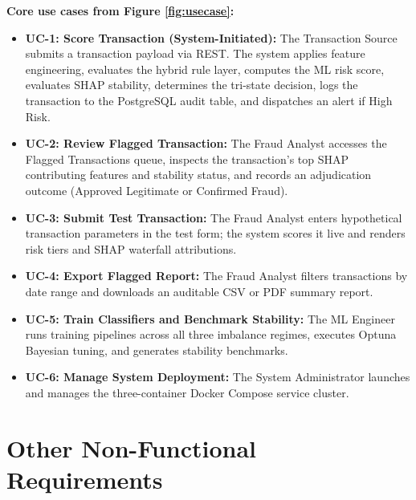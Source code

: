\documentclass[12pt, a4paper]{report}
\begin{document}
\noindent\textbf{Core use cases from Figure \ref{fig:usecase}:}
\begin{itemize}
    \item \textbf{UC-1: Score Transaction (System-Initiated):} The Transaction Source submits a transaction payload via REST. The system applies feature engineering, evaluates the hybrid rule layer, computes the ML risk score, evaluates SHAP stability, determines the tri-state decision, logs the transaction to the PostgreSQL audit table, and dispatches an alert if High Risk.
    \item \textbf{UC-2: Review Flagged Transaction:} The Fraud Analyst accesses the Flagged Transactions queue, inspects the transaction's top SHAP contributing features and stability status, and records an adjudication outcome (Approved Legitimate or Confirmed Fraud).
    \item \textbf{UC-3: Submit Test Transaction:} The Fraud Analyst enters hypothetical transaction parameters in the test form; the system scores it live and renders risk tiers and SHAP waterfall attributions.
    \item \textbf{UC-4: Export Flagged Report:} The Fraud Analyst filters transactions by date range and downloads an auditable CSV or PDF summary report.
    \item \textbf{UC-5: Train Classifiers and Benchmark Stability:} The ML Engineer runs training pipelines across all three imbalance regimes, executes Optuna Bayesian tuning, and generates stability benchmarks.
    \item \textbf{UC-6: Manage System Deployment:} The System Administrator launches and manages the three-container Docker Compose service cluster.
\end{itemize}

\newpage

\chapter{Other Non-Functional Requirements}
\end{document}
